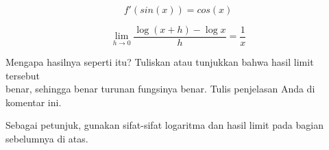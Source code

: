 \documentclass[12pt,arial,letterpaper]{book}
\begin{document}
\begin{eulercomment}
\begin{eulercomment}
\begin{eulercomment}
\begin{eulercomment}
\begin{eulercomment}
\begin{eulercomment}
\begin{eulercomment}
\begin{eulercomment}
\begin{eulercomment}
\begin{eulercomment}
\begin{eulercomment}
\begin{eulercomment}
\begin{eulercomment}
\begin{eulercomment}
\begin{eulercomment}
\begin{eulercomment}
\begin{eulercomment}
\begin{eulercomment}
\begin{eulercomment}
\begin{eulercomment}
\begin{eulercomment}
\begin{eulercomment}
\begin{eulercomment}
\end{eulercomment}
\begin{eulerformula}
\[
f'(sin(x)) = cos(x)
\]
\end{eulerformula}
\eulersubheading{}
\begin{eulerformula}
\[
\lim_{h\rightarrow 0}{\frac{\log \left(x+h\right)-\log x}{h}}=
 \frac{1}{x}
\]
\end{eulerformula}
\begin{eulercomment}
Mengapa hasilnya seperti itu? Tuliskan atau tunjukkan bahwa hasil
limit tersebut\\
benar, sehingga benar turunan fungsinya benar.  Tulis penjelasan Anda
di komentar ini.

Sebagai petunjuk, gunakan sifat-sifat logaritma dan hasil limit pada
bagian sebelumnya di atas.


\end{eulercomment}
\end{eulercomment}
\end{eulercomment}
\end{eulercomment}
\end{eulercomment}
\end{eulercomment}
\end{eulercomment}
\end{eulercomment}
\end{eulercomment}
\end{eulercomment}
\end{eulercomment}
\end{eulercomment}
\end{eulercomment}
\end{eulercomment}
\end{eulercomment}
\end{eulercomment}
\end{eulercomment}
\end{eulercomment}
\end{eulercomment}
\end{eulercomment}
\end{eulercomment}
\end{eulercomment}
\end{eulercomment}
\end{document}
